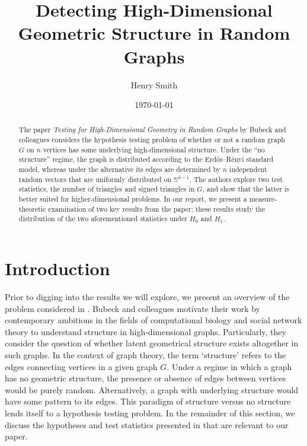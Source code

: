\documentclass{article}
\title{\textbf{Detecting High-Dimensional Geometric Structure in Random Graphs}}
\author[]{Henry Smith}
\affil[]{\normalsize Yale University}
\date{\today}
\begin{document}
\maketitle

\begin{abstract}
    \noindent The paper \textit{Testing for High-Dimensional Geometry in Random Graphs} by Bubeck and colleagues considers the hypothesis testing problem of whether or not a random graph $G$ on $n$ vertices has some underlying high-dimensional structure. Under the \enquote{no structure} regime, the graph is distributed according to the Erdős–Rényi standard model, whereas under the alternative its edges are determined by $n$ independent random vectors that are uniformly distributed on $\mathbb{S}^{d-1}$. The authors explore two test statistics, the number of triangles and signed triangles in $G$, and show that the latter is better suited for higher-dimensional problems. In our report, we present a measure-theoretic examination of two key results from the paper; these results study the distribution of the two aforementioned statistics under $H_0$ and $H_1$. \end{abstract}

\pagebreak

\section{Introduction}
Prior to digging into the results we will explore, we present an overview of the problem considered in \cite{bubeck2016testing}. Bubeck and colleagues motivate their work by contemporary ambitions in the fields of computational biology and social network theory to understand structure in high-dimensional graphs. Particularly, they consider the question of whether latent geometrical structure exists altogether in such graphs. In the context of graph theory, the term `structure' refers to the edges connecting vertices in a given graph $G$. Under a regime in which a graph has no geometric structure, the presence or absence of edges between vertices would be purely random. Alternatively, a graph with underlying structure would have some pattern to its edges. This paradigm of structure versus no structure lends itself to a hypothesis testing problem. In the remainder of this section, we discuss the hypotheses and test statistics presented in \cite{bubeck2016testing} that are relevant to our paper.
\end{document}
